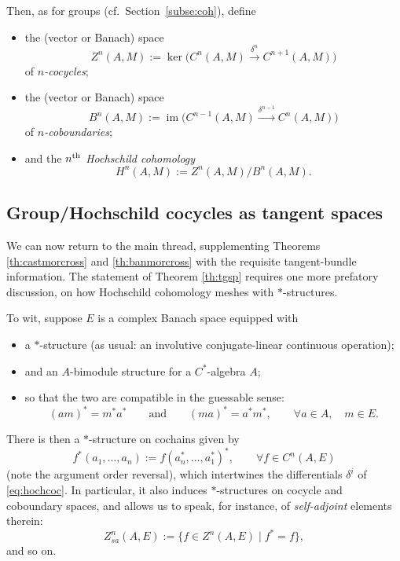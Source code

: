 \documentclass[pdftex]{sigma}
\numberwithin{equation}{section}
\DeclareMathOperator{\im}{\mathrm{im}}
\begin{document}
Then, as for groups (cf.\ Section~\ref{subse:coh}), define
\begin{itemize}\itemsep=0pt
\item the (vector or Banach) space
 \begin{equation*}
 Z^n(A,M):=\ker\big(C^n(A,M)\xrightarrow{\delta^n}C^{n+1}(A,M)\big)
 \end{equation*}
 of {\it $n$-cocycles};
\item the (vector or Banach) space
 \begin{equation*}
 B^n(A,M):=\im\big(C^{n-1}(A,M)\xrightarrow{\delta^{n-1}}C^{n}(A,M)\big)
 \end{equation*}
 of {\it $n$-coboundaries};
\item and the {\it $n^{\rm th}$ Hochschild cohomology}
 \begin{equation*}
 H^n(A,M):=Z^n(A,M)/B^n(A,M).
 \end{equation*}
\end{itemize}

\subsection{Group/Hochschild cocycles as tangent spaces}\label{subse:cocytg}

We can now return to the main thread, supplementing Theorems \ref{th:castmorcross} and \ref{th:banmorcross} with the requisite tangent-bundle information. The statement of Theorem \ref{th:tgsp} requires one more prefatory discussion, on how Hochschild cohomology meshes with $*$-structures.

To wit, suppose $E$ is a complex Banach space equipped with
\begin{itemize}\itemsep=0pt
\item a $*$-structure (as usual: an involutive conjugate-linear continuous operation);
\item and an $A$-bimodule structure for a $C^*$-algebra $A$;
\item so that the two are compatible in the guessable sense:
 \begin{equation*}
 (am)^* = m^* a^*
 \qquad\text{and}\qquad
 (ma)^* = a^* m^*,\qquad \forall a\in A,\quad m\in E.
 \end{equation*}
\end{itemize}
There is then a $*$-structure on cochains given by
\begin{equation*}
 f^*(a_1, \dots, a_n):=f(a_n^*, \dots, a_1^*)^*,\qquad \forall f\in C^n(A,E)
\end{equation*}
(note the argument order reversal), which intertwines the differentials $\delta^i$ of \eqref{eq:hochcoc}. In particular, it also induces $*$-structures on cocycle and coboundary spaces, and allows us to speak, for instance, of {\it self-adjoint} elements therein:
\begin{equation*}
 Z_{sa}^n(A,E):=\{f\in Z^n(A,E)\mid f^*=f\},
\end{equation*}
and so on.
\end{document}

